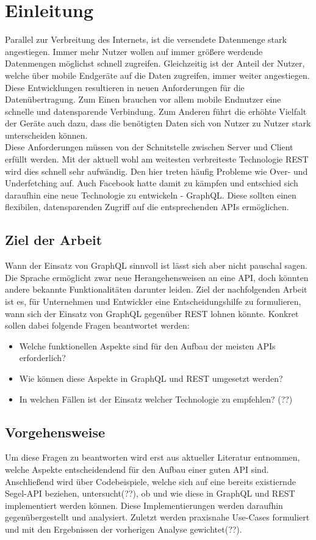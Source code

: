 \chapter{Einleitung}

Parallel zur Verbreitung des Internets, ist die versendete Datenmenge stark angestiegen. Immer mehr Nutzer wollen auf immer größere werdende Datenmengen möglichst schnell zugreifen. Gleichzeitig ist der Anteil der Nutzer, welche über mobile Endgeräte auf die Daten zugreifen, immer weiter angestiegen. \cite{Enge,2019}
Diese Entwicklungen resultieren in neuen Anforderungen für die Datenübertragung. Zum Einen brauchen vor allem mobile Endnutzer eine schnelle und datensparende Verbindung. Zum Anderen führt die erhöhte Vielfalt der Geräte auch dazu, dass die benötigten Daten sich von Nutzer zu Nutzer stark unterscheiden können.
\\
Diese Anforderungen müssen von der Schnitstelle zwischen Server und Client erfüllt werden. Mit der aktuell wohl am weitesten verbreiteste Technologie REST wird dies schnell sehr aufwändig. Den hier treten häufig Probleme wie Over- und Underfetching auf. Auch Facebook hatte damit zu kämpfen und entschied sich daraufhin eine neue Technologie zu entwickeln - GraphQL. Diese sollten einen flexibilen, datensparenden Zugriff auf die entsprechenden APIs ermöglichen. 

\section{Ziel der Arbeit}

Wann der Einsatz von GraphQL sinnvoll ist lässt sich aber nicht pauschal sagen. Die Sprache ermöglicht zwar neue Herangehensweisen an eine API, doch könnten andere bekannte Funktionalitäten darunter leiden. Ziel der nachfolgenden Arbeit ist es, für Unternehmen und Entwickler eine Entscheidungshilfe zu formulieren, wann sich der Einsatz von GraphQL gegenüber REST lohnen könnte. Konkret sollen dabei folgende Fragen beantwortet werden:

\begin{itemize}
\item Welche funktionellen Aspekte sind für den Aufbau der meisten APIs erforderlich?
\item Wie können diese Aspekte in GraphQL und REST umgesetzt werden?
\item In welchen Fällen ist der Einsatz welcher Technologie zu empfehlen? (??)
\end{itemize}

\section{Vorgehensweise}

Um diese Fragen zu beantworten wird erst aus aktueller Literatur entnommen, welche Aspekte entscheidendend für den Aufbau einer guten API sind. Anschließend wird über Codebeispiele, welche sich auf eine bereits existiernde Segel-API beziehen, untersucht(??), ob und wie diese in GraphQL und REST implementiert werden können. Diese Implementierungen werden daraufhin gegenübergestellt und analysiert. Zuletzt werden praxisnahe Use-Cases formuliert und mit den Ergebnissen der vorherigen Analyse gewichtet(??). 